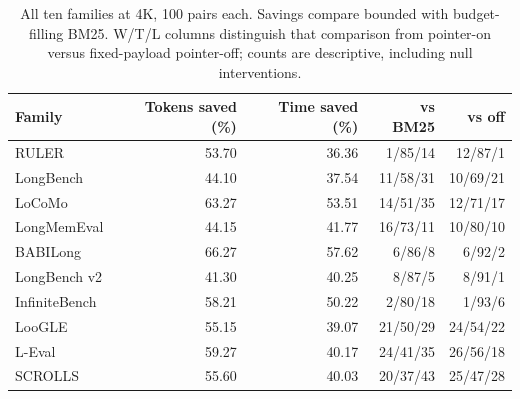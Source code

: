 \begin{table}[H]
\centering
\footnotesize
\setlength{\tabcolsep}{4pt}
\caption{All ten families at 4K, 100 pairs each. Savings compare bounded with budget-filling BM25. W/T/L columns distinguish that comparison from pointer-on versus fixed-payload pointer-off; counts are descriptive, including null interventions.}
\label{tab:sub-families}
\begin{tabular}{lrrrr}
\toprule
Family & Tokens saved (\%) & Time saved (\%) & vs BM25 & vs off \\
\midrule
RULER & 53.70 & 36.36 & 1/85/14 & 12/87/1 \\
LongBench & 44.10 & 37.54 & 11/58/31 & 10/69/21 \\
LoCoMo & 63.27 & 53.51 & 14/51/35 & 12/71/17 \\
LongMemEval & 44.15 & 41.77 & 16/73/11 & 10/80/10 \\
BABILong & 66.27 & 57.62 & 6/86/8 & 6/92/2 \\
LongBench v2 & 41.30 & 40.25 & 8/87/5 & 8/91/1 \\
InfiniteBench & 58.21 & 50.22 & 2/80/18 & 1/93/6 \\
LooGLE & 55.15 & 39.07 & 21/50/29 & 24/54/22 \\
L-Eval & 59.27 & 40.17 & 24/41/35 & 26/56/18 \\
SCROLLS & 55.60 & 40.03 & 20/37/43 & 25/47/28 \\
\bottomrule
\end{tabular}
\end{table}
